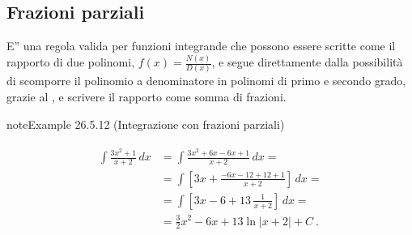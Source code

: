 \documentclass[letterpaper,10pt,italian]{jupyterBook}
\begin{document}
\subsection{Frazioni parziali}
\label{\detokenize{ch/infinitesimal_calculus/integrals:frazioni-parziali}}
\sphinxAtStartPar
{} E” una regola valida per funzioni integrande che possono essere scritte come il rapporto di due polinomi, \(f(x) = \frac{N(x)}{D(x)}\), e segue direttamente dalla possibilità di scomporre il polinomio a denominatore in polinomi di primo e secondo grado, grazie al {\hyperref[\detokenize{ch/precalculus/polynomials:math-hs-precalculus-polynomials-alg-fund-thm}]{}}, e scrivere il rapporto come somma di frazioni.

\sphinxAtStartPar
{} 
\label{ch/infinitesimal_calculus/integrals:integrals-methods-partial-fraction-1}
\begin{sphinxadmonition}{note}{Example 26.5.12 (Integrazione con frazioni parziali)}


\begin{equation*}
\begin{split}\begin{aligned}
  \int \frac{3 x^2 + 1}{ x + 2} \, dx
  & = \int \frac{3 x^2 + 6x - 6x + 1}{x+2} \,dx = \\
  & = \int \left[ 3 x + \frac{-6 x - 12 + 12 +1 }{x + 2} \right] \, dx = \\
  & = \int \left[ 3 x - 6 + 13 \, \frac{1}{x + 2} \right] \, dx = \\
  & = \frac{3}{2} x^2 - 6 x + 13 \ln |x+2| + C \ .
\end{aligned}\end{split}
\end{equation*}\end{sphinxadmonition}
\label{ch/infinitesimal_calculus/integrals:integrals-methods-partial-fraction-2}
\end{document}
